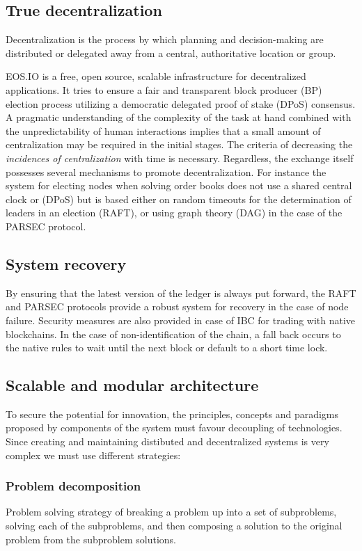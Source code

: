 \documentclass[]{article}
\begin{document}
{	\subsection{True decentralization}
	 Decentralization is the process by which planning and decision-making are distributed or delegated away 
	 from a central, authoritative location or group.
	 
	 EOS.IO is a free, open source, scalable infrastructure for decentralized applications. 
	 It tries to ensure a fair and transparent block producer (BP) election process 
	 utilizing a democratic delegated proof of stake (DPoS) consensus.
	 A pragmatic understanding of the complexity of the task at hand combined with the unpredictability of human interactions 
	 implies that a small amount of centralization may be required in the initial stages.
	 The criteria of decreasing the \textit{incidences of centralization} with time is necessary. 	 
	 Regardless, the exchange itself possesses several mechanisms to promote decentralization. 
	 For instance the system for electing nodes when solving order books does not use a shared central clock or (DPoS) 
	 but is based either on random timeouts for the determination of leaders in an election (RAFT), 
	 or using graph theory (DAG) in the case of the PARSEC protocol.
	 
	\subsection{System recovery}
	By ensuring that the latest version of the ledger is always put forward, 
	the RAFT and PARSEC protocols provide a robust system for recovery in the case of node failure.
	Security measures are also provided in case of IBC for trading with native blockchains. 
	In the case of non-identification of the chain, a fall back occurs to the native rules to wait until the next block or default to a short time lock.
	
	\subsection{Scalable and modular architecture}
	To secure the potential for innovation, the principles, 
	concepts and paradigms proposed by components of the system
	must favour decoupling of technologies. 
	Since creating and maintaining distibuted and decentralized systems
	is very complex we must use different strategies: 
	\subsubsection{Problem decomposition}
	Problem solving strategy of breaking a problem up into a set of subproblems, solving each of the subproblems, 
	and then composing a solution to the original problem from the subproblem solutions.
}
\end{document}
